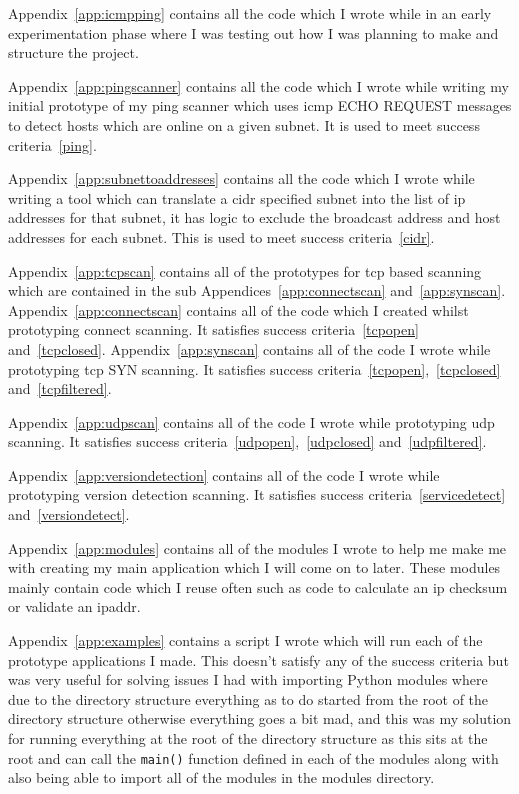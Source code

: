\documentclass[titlepage]{article}
\begin{document}
Appendix~\ref{app:icmpping} contains all the code which I wrote while in an early experimentation
phase where I was testing out how I was planning to make and structure the project.

Appendix~\ref{app:pingscanner} contains all the code which I wrote while writing my initial prototype
of my ping scanner which uses \gls{icmp} ECHO REQUEST messages to detect hosts which are online on a given
subnet.
It is used to meet success criteria~\ref{ping}.

Appendix~\ref{app:subnettoaddresses} contains all the code which I wrote while writing a tool which
can translate a \gls{cidr} specified subnet into the list of \gls{ip} addresses for that subnet,
it has logic to exclude the broadcast address and host addresses for each subnet.
This is used to meet success criteria~\ref{cidr}.

Appendix~\ref{app:tcpscan} contains all of the prototypes for \gls{tcp} based scanning which are contained
in the sub Appendices~\ref{app:connectscan} and~\ref{app:synscan}. Appendix~\ref{app:connectscan} contains
all of the code which I created whilst prototyping connect scanning. It satisfies success criteria~\ref{tcpopen}
and~\ref{tcpclosed}. Appendix~\ref{app:synscan} contains all of the code I wrote while prototyping \gls{tcp} SYN
scanning. It satisfies success criteria~\ref{tcpopen},~\ref{tcpclosed} and~\ref{tcpfiltered}.

Appendix~\ref{app:udpscan} contains all of the code I wrote while prototyping \gls{udp} scanning.
It satisfies success criteria~\ref{udpopen},~\ref{udpclosed} and~\ref{udpfiltered}.

Appendix~\ref{app:versiondetection} contains all of the code I wrote while prototyping version detection
scanning. It satisfies success criteria~\ref{servicedetect} and~\ref{versiondetect}.

Appendix~\ref{app:modules} contains all of the modules I wrote to help me make me with creating
my main application which I will come on to later. These modules mainly contain code which I reuse often
such as code to calculate an ip checksum or validate an \gls{ipaddr}.

Appendix~\ref{app:examples} contains a script I wrote which will run each of the prototype applications I
made. This doesn't satisfy any of the success criteria but was very useful for solving issues I had with
importing Python modules where due to the directory structure everything as to do started from the root of
the directory structure otherwise everything goes a bit mad, and this was my solution for running everything
at the root of the directory structure as this sits at the root and can call the \verb|main()| function
defined in each of the modules along with also being able to import all of the modules in the modules directory.
\end{document}
